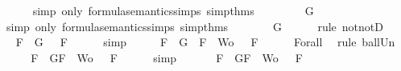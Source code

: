 \begin{isabellebody}
\ \ \ \ \isamarkupfalse%
\ {\isacharparenleft}simp\ only{\isacharcolon}\ formula{\isacharunderscore}semantics{\isachardot}simps{\isacharparenleft}{}{\isacharparenright}\ simp{\isacharunderscore}thms{\isacharparenleft}{}{\isacharparenright}{\isacharparenright}\isanewline
\ \ \isamarkupfalse%
\ \isamarkupfalse%
\ {\isachardoublequoteopen}{\isasymnot}\ {\isasymnot}{\isasymA}\ {\isasymTurnstile}\ G{\isachardoublequoteclose}\isanewline
\ \ \ \ \isamarkupfalse%
\ {\isacharparenleft}simp\ only{\isacharcolon}\ formula{\isacharunderscore}semantics{\isachardot}simps{\isacharparenleft}{}{\isacharparenright}\ simp{\isacharunderscore}thms{\isacharparenleft}{}{\isacharparenright}{\isacharparenright}\isanewline
\ \ \isamarkupfalse%
\ \isamarkupfalse%
\ {\isachardoublequoteopen}{\isasymA}\ {\isasymTurnstile}\ G{\isachardoublequoteclose}\isanewline
\ \ \ \ \isamarkupfalse%
\ {\isacharparenleft}rule\ notnotD{\isacharparenright}\isanewline
\ \ \isamarkupfalse%
\ \isamarkupfalse%
\ {\isachardoublequoteopen}{\isasymforall}F\ {\isasymin}\ {\isacharbraceleft}G{\isacharbraceright}{\isachardot}\ {\isasymA}\ {\isasymTurnstile}\ F{\isachardoublequoteclose}\isanewline
\ \ \ \ \isamarkupfalse%
\ simp\isanewline
\ \ \isamarkupfalse%
\ \isamarkupfalse%
\ {\isachardoublequoteopen}{\isasymforall}F\ {\isasymin}\ {\isacharparenleft}{\isacharbraceleft}G{\isacharbraceright}\ {\isasymunion}\ {\isacharparenleft}{\isacharbraceleft}F{\isacharbraceright}\ {\isasymunion}\ Wo{\isacharparenright}{\isacharparenright}{\isachardot}\ {\isasymA}\ {\isasymTurnstile}\ F{\isachardoublequoteclose}\isanewline
\ \ \ \ \isamarkupfalse%
\ Forall{}\ \isamarkupfalse%
\ {\isacharparenleft}rule\ ball{\isacharunderscore}Un{\isacharparenright}\isanewline
\ \ \isamarkupfalse%
\ \isamarkupfalse%
\ {\isachardoublequoteopen}{\isasymforall}F\ {\isasymin}\ {\isacharbraceleft}G{\isacharcomma}F{\isacharbraceright}\ {\isasymunion}\ Wo{\isachardot}\ {\isasymA}\ {\isasymTurnstile}\ F{\isachardoublequoteclose}\isanewline
\ \ \ \ \isamarkupfalse%
\ simp\isanewline
\ \ \isamarkupfalse%
\ \isamarkupfalse%
\ {\isachardoublequoteopen}{\isasymexists}{\isasymA}{\isachardot}\ {\isasymforall}F\ {\isasymin}\ {\isacharparenleft}{\isacharbraceleft}G{\isacharcomma}F{\isacharbraceright}\ {\isasymunion}\ Wo{\isacharparenright}{\isachardot}\ {\isasymA}\ {\isasymTurnstile}\ F{\isachardoublequoteclose}\isanewline

\end{isabellebody}
